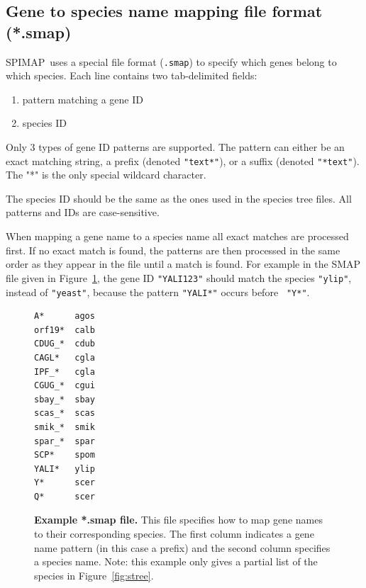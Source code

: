\documentclass[11pt]{article}
\newcommand{\figref}[1]{Figure~\ref{#1}}
\newcommand{\spimap}{{\sf\scshape SPIMAP}}
\begin{document}
\subsection{Gene to species name mapping file format (*.smap)}
\label{sec:file:smap}

\spimap\ uses a special file format ({\tt *.smap}) to specify which
genes belong to which species. Each line contains two tab-delimited
fields: 
\begin{enumerate}[itemsep=0pt,topsep=0pt]
\item pattern matching a gene ID
\item species ID
\end{enumerate}

Only 3 types of gene ID patterns are supported.  The pattern can
either be an exact matching string, a prefix (denoted {\tt "text*"}),
or a suffix (denoted {\tt "*text"}).  The "*" is the only special
wildcard character.

The species ID should be the same as the ones used in the species tree
files.  All patterns and IDs are case-sensitive.

When mapping a gene name to a species name all exact matches are
processed first.  If no exact match is found, the patterns are then
processed in the same order as they appear in the file until a match
is found. For example in the SMAP file given in \figref{fig:smap}, the
gene ID {\tt "YALI123"} should match the species {\tt "ylip"}, instead of
{\tt"yeast"}, because the pattern {\tt "YALI*"} occurs before {\tt
"Y*"}.


\begin{figure}
\begin{center}
\footnotesize
\begin{lstlisting}[frame=tblr]
A*      agos
orf19*  calb
CDUG_*  cdub
CAGL*   cgla
IPF_*   cgla
CGUG_*  cgui
sbay_*  sbay
scas_*  scas
smik_*  smik
spar_*  spar
SCP*    spom
YALI*   ylip
Y*      scer
Q*      scer
\end{lstlisting}
\end{center}

\caption{{\bf Example *.smap file.} This file specifies how to map
gene names to their corresponding species.  The first column indicates
a gene name pattern (in this case a prefix) and the second column specifies 
a species name.  Note: this example only gives a partial list of the species 
in \figref{fig:stree}. }
\label{fig:smap}
\end{figure}
\end{document}
